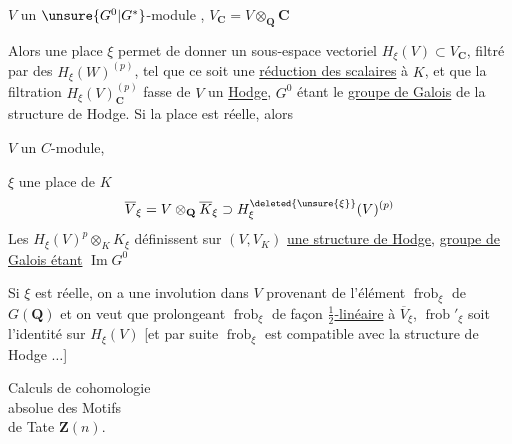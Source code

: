 $V$ un $\unsure{G^0|G^*}$-module , $V_{\mathbf C}=V\otimes_{\mathbf Q}\mathbf C$

Alors une place  $\xi$ permet de donner un sous-espace vectoriel $H_\xi(V)\subset V_{\mathbf C}$, filtré par des $H_\xi(W)^{(p)}$, tel que  ce soit une \uline{réduction des scalaires} à $K$, et que la filtration $H_\xi(V)_{\mathbf C}^{(p)}$ fasse de $V$ un  \uline{Hodge}, $G^0$ étant   le \uline{groupe de Galois} de la structure de Hodge. Si la place est réelle, alors

 $V$ un $C$-module,

$\xi$ une place de $K$
\[
\overline V_\xi=V\otimes_{\mathbf Q}\overline K_\xi\supset H^{\deleted{\unsure{\xi}}}_{\xi}(V)^{(p)}
\]
Les $H_\xi(V)^p\otimes_K K_\xi$ définissent sur $(V,V_K)$ \uline{une structure de Hodge},  \uline{groupe de Galois étant}  \uline{ $\operatorname{Im}G^0$}

Si $\xi$ est réelle, on a une involution dans $V$ provenant de l'élément  $\operatorname{frob}_\xi$ de $G(\mathbf Q)$ et on veut que prolongeant $\operatorname{frob}_\xi$ de façon \uline{$\frac12$-linéaire} à $\overline V_\xi$, $\operatorname{frob}'_\xi$ soit l'identité sur $H_\xi(V)$ [et par suite $\operatorname{frob}_\xi$ est compatible avec la structure de Hodge $\ldots$]


\begin{flushright}
Calculs de cohomologie\\
absolue des Motifs\\
de Tate $\mathbf Z(n)$.
\end{flushright}




